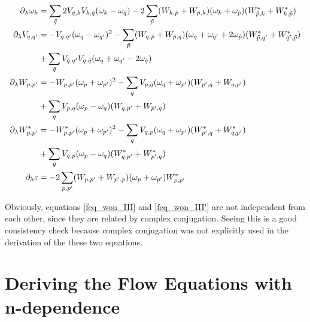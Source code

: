 \begin{appendix}
\begin{flushleft}
\begin{subequations}
\begin{align}
\partial_\lambda\omega_k&= \Sum_{\tilde q}2V_{\tilde q,k}V_{k,\tilde q}(\omega_k-\omega_{\tilde q})-2\Sum_{\tilde p}(W_{k,\tilde p}+W_{\tilde p,k})(\omega_k+\omega_{\tilde p})(W_{\tilde p, k}^*+W_{k,\tilde p}^*)\label{feq_won_I}\\ 
\partial_\lambda V_{q,q^\prime}&=-V_{q,q^\prime}(\omega_q-\omega_{q^\prime})^2-\Sum_{\tilde p}(W_{q,\tilde p}+W_{\tilde p,q})(\omega_q+\omega_{ q^\prime}+2\omega_{\tilde p})(W_{\tilde p, q^\prime}^*+W_{q^\prime,\tilde p}^*) \nonumber\\ \quad&
+ \Sum_{\tilde q}V_{\tilde q,q^\prime}V_{q,\tilde q}(\omega_q+\omega_{q^\prime}-2\omega_{\tilde q}) %
\label{feq_won_II} \\ 
\partial_\lambda W_{p,p^\prime}&=-W_{p,p^\prime}(\omega_p+\omega_{p^\prime})^2-\Sum_{ q}V_{ p, q}(\omega_q+\omega_{p^\prime})(W_{p^\prime,q}+W_{q,p^\prime}) \nonumber\\ \quad&
+ \Sum_{q}V_{{p},q}(\omega_{p}-\omega_{q}) (W_{ q, p^\prime}+W_{ p^\prime, q})\label{feq_won_III}\\ 
\partial_\lambda W_{p,p^\prime}^*&=-W_{p,p^\prime}^*(\omega_p+\omega_{p^\prime})^2-\Sum_{ q}V_{ q, p}(\omega_{q}+\omega_{p^\prime})(W_{p^\prime,q}^*+W_{q,p^\prime}^*)\nonumber\\ \quad& 
+\Sum_{q}V_{q,p}(\omega_{p}-\omega_{q}) (W_{ q, p^\prime}^*+W_{ p^\prime, {q}}^*)\label{feq_won_III'}\\ 
\partial_\lambda \varepsilon&=-2\Sum_{p,p^\prime}(W_{p,p^\prime}+W_{p^\prime,p})(\omega_p+\omega_{p^\prime})W_{p,p^\prime}^*\label{feq_won_IV}
\end{align}
\end{subequations}
\end{flushleft}
Obviously, equations \ref{feq_won_III} and \ref{feq_won_III'} are not independent from each other, since they are related by complex conjugation. Seeing this is a good consistency check because complex conjugation was not explicitly used in the derivation of the these two equations.\\
\section{Deriving the Flow Equations with n-dependence}


\end{appendix}
